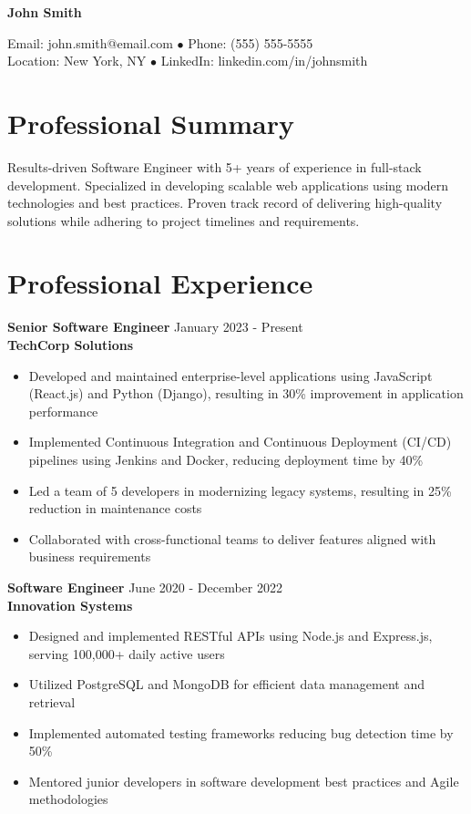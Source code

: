 \documentclass{article}
\newcommand{\name}[1]{%
    \begin{center}
        {\Large\bfseries #1}
    \end{center}
}
\newcommand{\contactline}[4]{%
    \begin{center}
        #1 $\bullet$ #2\\
        #3 $\bullet$ #4
    \end{center}
}
\begin{document}
\name{John Smith}
\contactline{Email: john.smith@email.com}{Phone: (555) 555-5555}
{Location: New York, NY}{LinkedIn: linkedin.com/in/johnsmith}

\section{Professional Summary}
Results-driven Software Engineer with 5+ years of experience in full-stack development. Specialized in developing scalable web applications using modern technologies and best practices. Proven track record of delivering high-quality solutions while adhering to project timelines and requirements.

\section{Professional Experience}

\textbf{Senior Software Engineer} \hfill January 2023 - Present\\
\textbf{TechCorp Solutions}
\begin{itemize}
    \item Developed and maintained enterprise-level applications using JavaScript (React.js) and Python (Django), resulting in 30\% improvement in application performance
    \item Implemented Continuous Integration and Continuous Deployment (CI/CD) pipelines using Jenkins and Docker, reducing deployment time by 40\%
    \item Led a team of 5 developers in modernizing legacy systems, resulting in 25\% reduction in maintenance costs
    \item Collaborated with cross-functional teams to deliver features aligned with business requirements
\end{itemize}

\textbf{Software Engineer} \hfill June 2020 - December 2022\\
\textbf{Innovation Systems}
\begin{itemize}
    \item Designed and implemented RESTful APIs using Node.js and Express.js, serving 100,000+ daily active users
    \item Utilized PostgreSQL and MongoDB for efficient data management and retrieval
    \item Implemented automated testing frameworks reducing bug detection time by 50\%
    \item Mentored junior developers in software development best practices and Agile methodologies
\end{itemize}
\end{document}

